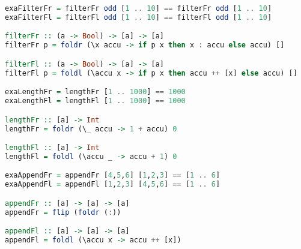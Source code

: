\begin{lstlisting}[language=Haskell]
exaFilterFr = filterFr odd [1 .. 10] == filterFr odd [1 .. 10]
exaFilterFl = filterFl odd [1 .. 10] == filterFl odd [1 .. 10]

filterFr :: (a -> Bool) -> [a] -> [a]
filterFr p = foldr (\x accu -> if p x then x : accu else accu) []

filterFl :: (a -> Bool) -> [a] -> [a]
filterFl p = foldl (\accu x -> if p x then accu ++ [x] else accu) []

exaLengthFr = lengthFr [1 .. 1000] == 1000
exaLengthFl = lengthFl [1 .. 1000] == 1000

lengthFr :: [a] -> Int
lengthFr = foldr (\_ accu -> 1 + accu) 0

lengthFl :: [a] -> Int
lengthFl = foldl (\accu _ -> accu + 1) 0

exaAppendFr = appendFr [4,5,6] [1,2,3] == [1 .. 6]
exaAppendFl = appendFl [1,2,3] [4,5,6] == [1 .. 6]

appendFr :: [a] -> [a] -> [a]
appendFr = flip (foldr (:))

appendFl :: [a] -> [a] -> [a]
appendFl = foldl (\accu x -> accu ++ [x])
\end{lstlisting}

\clearpage